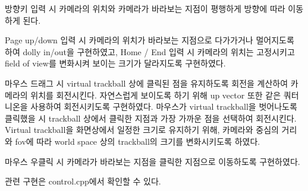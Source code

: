 \documentclass[11pt]{oblivoir}
\begin{document}
방향키 입력 시 카메라의 위치와 카메라가 바라보는 지점이 평행하게 방향에 따라 이동하게 된다.

Page up/down 입력 시 카메라의 위치가 바라보는 지점으로 다가가거나 멀어지도록 하여 dolly in/out을 구현하였고,
Home / End 입력 시 카메라의 위치는 고정시키고 field of view를 변화시켜 보이는 크기가 달라지도록 구현하였다.

마우스 드래그 시 virtual trackball 상에 클릭된 점을 유지하도록 회전을 계산하여 카메라의 위치를 회전시킨다. 자연스럽게 보이도록 하기 위해 up vector 또한 같은 쿼터니온을 사용하여 회전시키도록 구현하였다.
마우스가 virtual trackball을 벗어나도록 클릭했을 시 trackball 상에서 클릭한 지점과 가장 가까운 점을 선택하여 회전시킨다.
Virtual trackball을 화면상에서 일정한 크기로 유지하기 위해, 카메라와 중심의 거리와 fov에 따라 world space 상의 trackball의 크기를 변화시키도록 하였다.

마우스 우클릭 시 카메라가 바라보는 지점을 클릭한 지점으로 이동하도록 구현하였다.

관련 구현은 control.cpp에서 확인할 수 있다.
\end{document}
